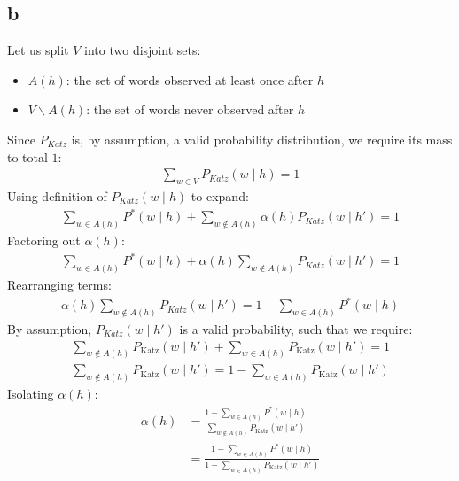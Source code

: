 \documentclass{article}
\numberwithin{equation}{section}
\begin{document}
    \subsection*{b}
    Let us split $V$ into two disjoint sets:
    \begin{itemize}
        \item $A(h)$: the set of words observed at least once after $h$
        \item $V \backslash A(h)$: the set of words never observed after $h$
    \end{itemize}
%
    Since $P_{Katz}$ is, by assumption, a valid probability distribution, we require its mass to total $1$:
    \begin{align*}
        \sum_{w \in V}P_{Katz}(w \mid h) = 1
    \end{align*}
    Using definition of $P_{Katz}(w \mid h)$ to expand:
    \begin{gather*}
        \sum_{w \in A(h)}P^*(w \mid h) + \sum_{w \notin A(h)} \alpha(h)P_{Katz}(w \mid h') = 1
    \end{gather*}
    Factoring out $\alpha(h)$:
    \begin{align*}
        \sum_{w \in A(h)}P^*(w \mid h) + \alpha(h) \sum_{w \notin A(h)}P_{Katz}(w \mid h') = 1
    \end{align*}
%
    Rearranging terms:
    \begin{align*}
        \alpha(h) \sum_{w \notin A(h)}P_{Katz}(w \mid h') = 1 - \sum_{w \in A(h)}P^*(w \mid h)
    \end{align*}
%
    By assumption, $P_{Katz}(w \mid h')$ is a valid probability, such that we require:
    \begin{align*}
        \sum_{w \notin A(h)} P_{\text{Katz}}(w \mid h') + \sum_{w \in A(h)} P_{\text{Katz}}(w \mid h') = 1  \\
        \sum_{w \notin A(h)} P_{\text{Katz}}(w \mid h') = 1 - \sum_{w \in A(h)} P_{\text{Katz}}(w \mid h')
    \end{align*}
%
    Isolating $\alpha(h)$:
    \begin{align*}
        \alpha(h) &= \frac{1 - \sum_{w \in A(h)} P^*(w \mid h)}{\sum_{w \notin A(h)} P_{\text{Katz}}(w \mid h')} \\
            &= \boxed{\frac{1 - \sum_{w \in A(h)} P^*(w \mid h)}{1 - \sum_{w \in A(h)} P_{\text{Katz}}(w \mid h')}}
    \end{align*}
\end{document}
